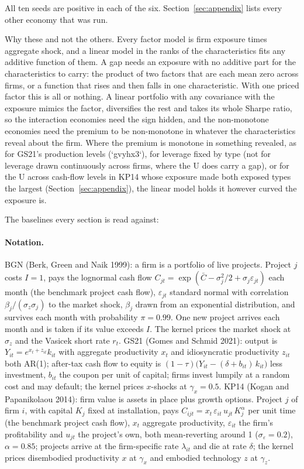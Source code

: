 \documentclass[11pt]{article}
\begin{document}
\noindent All ten seeds are positive in each of the six. Section~\ref{sec:appendix} lists every other economy that was run.

Why these and not the others. Every factor model is firm exposure times aggregate shock, and a linear model in the ranks of the characteristics fits any additive function of them. A gap needs an exposure with no additive part for the characteristics to carry: the product of two factors that are each mean zero across firms, or a function that rises and then falls in one characteristic. With one priced factor this is all or nothing. A linear portfolio with any covariance with the exposure mimics the factor, diversifies the rest and takes its whole Sharpe ratio, so the interaction economies need the sign hidden, and the non-monotone economies need the premium to be non-monotone in whatever the characteristics reveal about the firm. Where the premium is monotone in something revealed, as for GS21's production levels (`gvyhx3`), for leverage fixed by type (not for leverage drawn continuously across firms, where the U does carry a gap), or for the U across cash-flow levels in KP14 whose exposure made both exposed types the largest (Section~\ref{sec:appendix}), the linear model holds it however curved the exposure is.

The baselines every section is read against:


\paragraph{Notation.} BGN (Berk, Green and Naik 1999): a firm is a portfolio of live projects. Project $j$ costs $I = 1$, pays the lognormal cash flow $C_{jt} = \exp(\bar C - \sigma_j^2/2 + \sigma_j \varepsilon_{jt})$ each month (the benchmark project cash flow), $\varepsilon_{jt}$ standard normal with correlation $\beta_j/(\sigma_z \sigma_j)$ to the market shock, $\beta_j$ drawn from an exponential distribution, and survives each month with probability $\pi = 0.99$. One new project arrives each month and is taken if its value exceeds $I$. The kernel prices the market shock at $\sigma_z$ and the Vasicek short rate $r_t$. GS21 (Gomes and Schmid 2021): output is $Y_{it} = e^{x_t + z_{it}} k_{it}$ with aggregate productivity $x_t$ and idiosyncratic productivity $z_{it}$ both AR(1); after-tax cash flow to equity is $(1-\tau)\big(Y_{it} - (\delta + b_{it})\,k_{it}\big)$ less investment, $b_{it}$ the coupon per unit of capital; firms invest lumpily at a random cost and may default; the kernel prices $x$-shocks at $\gamma_x = 0.5$. KP14 (Kogan and Papanikolaou 2014): firm value is assets in place plus growth options. Project $j$ of firm $i$, with capital $K_j$ fixed at installation, pays $C_{ijt} = x_t\,\varepsilon_{it}\,u_{jt}\,K_j^\alpha$ per unit time (the benchmark project cash flow), $x_t$ aggregate productivity, $\varepsilon_{it}$ the firm's profitability and $u_{jt}$ the project's own, both mean-reverting around 1 ($\sigma_\varepsilon = 0.2$), $\alpha = 0.85$; projects arrive at the firm-specific rate $\lambda_{it}$ and die at rate $\delta$; the kernel prices disembodied productivity $x$ at $\gamma_x$ and embodied technology $z$ at $\gamma_z$.
\end{document}
